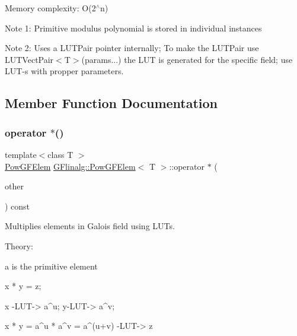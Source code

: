 Memory complexity\+: O(2$^\wedge$n)

Note 1\+: Primitive modulus polynomial is stored in individual instances

Note 2\+: Uses a L\+U\+T\+Pair pointer internally; To make the L\+U\+T\+Pair use L\+U\+T\+Vect\+Pair$<$\+T$>$(params...) the L\+UT is generated for the specific field; use L\+U\+T-\/s with propper parameters. 

\subsection{Member Function Documentation}
\mbox{\label{class_g_flinalg_1_1_pow_g_f_elem_af1205ad68d41bbc4df5d88e1895e1f46}} 
\subsubsection{\texorpdfstring{operator $\ast$()}{operator *()}}
{\footnotesize\ttfamily template$<$class T $>$ \\
\mbox{\hyperlink{class_g_flinalg_1_1_pow_g_f_elem}{Pow\+G\+F\+Elem}} \mbox{\hyperlink{class_g_flinalg_1_1_pow_g_f_elem}{G\+Flinalg\+::\+Pow\+G\+F\+Elem}}$<$ T $>$\+::operator $\ast$ (\begin{DoxyParamCaption}\item[{const \mbox{\hyperlink{class_g_flinalg_1_1_pow_g_f_elem}{Pow\+G\+F\+Elem}}$<$ T $>$ \&}]{other }\end{DoxyParamCaption}) const\hspace{0.3cm}{\ttfamily [inline]}}



Multiplies elements in Galois field using L\+U\+Ts. 

Theory\+: \begin{DoxyVerb}a is the primitive element

x * y = z;

x -LUT-> a^u; y-LUT-> a^v;

x * y = a^u * a^v = a^(u+v) -LUT-> z
\end{DoxyVerb}
 \mbox{\label{class_g_flinalg_1_1_pow_g_f_elem_ad7ede876f4be2e83996635958b727bf9}} 
